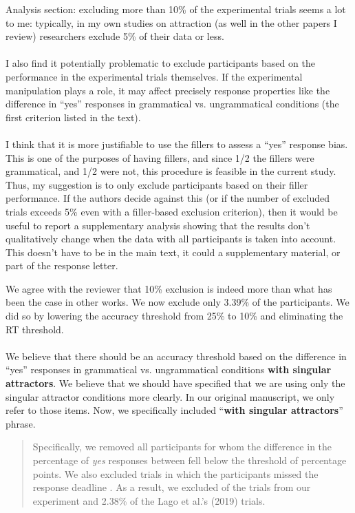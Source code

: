 \documentclass{ar2rc}
\begin{document}
\RC Analysis section: excluding more than 10\% of the experimental trials seems a lot to me: typically, in my own studies on attraction (as well in the other papers I review) researchers exclude 5\% of their data or less.\\\\
I also find it potentially problematic to exclude participants based on the performance in the experimental trials themselves. If the experimental manipulation plays a role, it may affect precisely response properties like the difference in ``yes'' responses in grammatical vs. ungrammatical conditions (the first criterion listed in the text).\\\\
I think that it is more justifiable to use the fillers to assess a ``yes'' response bias. This is one of the purposes of having fillers, and since 1/2 the fillers were grammatical, and 1/2 were not, this procedure is feasible in the current study. Thus, my suggestion is to only exclude participants based on their filler performance. If the authors decide against this (or if the number of excluded trials exceeds 5\% even with a filler-based exclusion criterion), then it would be useful to report a supplementary analysis showing that the results don't qualitatively change when the data with all participants is taken into account. This doesn't have to be in the main text, it could a supplementary material, or part of the response letter.

\AC We agree with the reviewer that 10\% exclusion is indeed more than what has been the case in other works. We now exclude only 3.39\% of the participants. We did so by lowering the accuracy threshold from 25\% to 10\% and eliminating the RT threshold. \\\\
We believe that there should be an accuracy threshold based on the difference in ``yes'' responses in grammatical vs. ungrammatical conditions {\bf with singular attractors}. We believe that we should have specified that we are using only the singular attractor conditions more clearly. In our original manuscript, we only refer to those items. Now, we specifically included ``{\bf with singular attractors}'' phrase.

\begin{quote}
    Specifically, we removed all participants for whom the difference in the percentage of \textit{yes} responses between \DIFaddbegin {} \DIFaddend \DIFdelbegin {} fell below the threshold of \DIFdelbegin {} \DIFdelend \DIFaddbegin {} \DIFaddend percentage points. We also excluded trials in which the participants missed the response deadline \DIFdelbegin {}\DIFdelend. As a result, we excluded \DIFdelbegin {} \DIFdelend \DIFaddbegin {} \DIFaddend of the trials from our experiment and 2.38\% of the Lago et al.’s (2019) trials. 
\end{quote}
\end{document}
